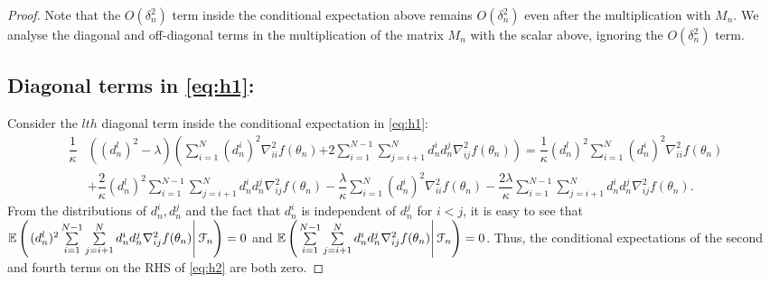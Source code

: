 \begin{proof}
Note that the $O(\delta_n^2)$ term inside the conditional expectation above remains $O(\delta_n^2)$ even after the multiplication with $M_n$.
We analyse the diagonal and off-diagonal terms in the multiplication of the matrix $M_n$ with the scalar above, ignoring the $O(\delta_n^2)$ term. 

\subsection*{Diagonal terms in \eqref{eq:h1}:}

Consider the $lth$ diagonal term inside the conditional expectation in \eqref{eq:h1}:
\begin{align}
\dfrac{1}{\kappa} & \left((d_n^l)^2-\lambda\right) \left(\sum\limits_{i=1}^N (d_n^i)^2 \nabla^2_{ii} f(\theta_n)\right. \left. + 2\sum\limits_{i=1}^{N-1}\sum\limits_{j=i+1}^N d_n^i d_n^j \nabla^2_{ij} f(\theta_n)\right)
=\dfrac{1}{\kappa} (d_n^l)^2 \sum\limits_{i=1}^N (d_n^i)^2 \nabla^2_{ii} f(\theta_n) \nonumber\\
& + \dfrac{2}{\kappa} (d_n^l)^2\sum\limits_{i=1}^{N-1}\sum\limits_{j=i+1}^N d_n^i d_n^j \nabla^2_{ij} f(\theta_n) - \dfrac{ \lambda}{\kappa} \sum\limits_{i=1}^N (d_n^i)^2 \nabla^2_{ii} f(\theta_n) - \dfrac{2 \lambda}{ \kappa} \sum\limits_{i=1}^{N-1}\sum\limits_{j=i+1}^N d_n^i d_n^j \nabla^2_{ij} f(\theta_n).\label{eq:h2}
\end{align}
From the distributions of $d_n^i,d_n^j$ and the fact that $d_n^i$ is independent of $d_n^j$ for $i<j$, it is easy to see that $\mathbb{E}\left(\left. (d_n^l)^2\sum\limits_{i=1}^{N-1}\sum\limits_{j=i+1}^N d_n^i d_n^j \nabla^2_{ij} f(\theta_n) \right| \mathcal{F}_n\right) = 0$ and $\mathbb{E}\left(\left.\sum\limits_{i=1}^{N-1}\sum\limits_{j=i+1}^N d_n^i d_n^j \nabla^2_{ij} f(\theta_n) \right| \mathcal{F}_n\right) = 0$. Thus, the conditional expectations of the second and fourth terms on the RHS of \eqref{eq:h2} are both zero. 


\end{proof}
